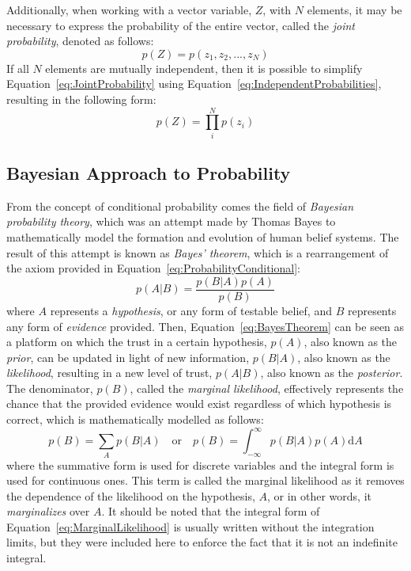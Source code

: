 \documentclass{article}
\begin{document}
Additionally, when working with a vector variable, $Z$, with $N$ elements, it may be necessary to express the probability of the entire vector, called the \emph{joint probability}, denoted as follows:
\begin{equation}
\label{eq:JointProbability}
	p\!\left(Z\right) = p\!\left(z_1,z_2,...,z_N\right)
\end{equation}
If all $N$ elements are mutually independent, then it is possible to simplify Equation~\eqref{eq:JointProbability} using Equation~\eqref{eq:IndependentProbabilities}, resulting in the following form:
\begin{equation}
\label{eq:IndependentJointProbability}
	p\!\left(Z\right) = \prod_{i}^{N} p\!\left(z_i\right)
\end{equation}

\subsection{Bayesian Approach to Probability}
\label{subsec:BayesianProbability}

From the concept of conditional probability comes the field of \emph{Bayesian probability theory}, which was an attempt made by Thomas Bayes to mathematically model the formation and evolution of human belief systems. The result of this attempt is known as \emph{Bayes' theorem}, which is a rearrangement of the axiom provided in Equation~\eqref{eq:ProbabilityConditional}:
\begin{equation}
\label{eq:BayesTheorem}
	p\!\left(A|B\right) = \frac{p\!\left(B|A\right) p\!\left(A\right)}{p\!\left(B\right)}
\end{equation}
where $A$ represents a \emph{hypothesis}, or any form of testable belief, and $B$ represents any form of \emph{evidence} provided. Then, Equation~\eqref{eq:BayesTheorem} can be seen as a platform on which the trust in a certain hypothesis, $p\!\left(A\right)$, also known as the \emph{prior}, can be updated in light of new information, $p\!\left(B|A\right)$, also known as the \emph{likelihood}, resulting in a new level of trust, $p\!\left(A|B\right)$, also known as the \emph{posterior}. The denominator, $p\!\left(B\right)$, called the \emph{marginal likelihood}, effectively represents the chance that the provided evidence would exist regardless of which hypothesis is correct, which is mathematically modelled as follows:
\begin{equation}
\label{eq:MarginalLikelihood}
	p\!\left(B\right) = \sum_{A} p\!\left(B|A\right) \quad \text{or} \quad p\!\left(B\right) = \int_{-\infty}^{\infty} p\!\left(B|A\right) p\!\left(A\right) \text{d}A
\end{equation}
where the summative form is used for discrete variables and the integral form is used for continuous ones. This term is called the marginal likelihood as it removes the dependence of the likelihood on the hypothesis, $A$, or in other words, it \emph{marginalizes} over $A$. It should be noted that the integral form of Equation~\eqref{eq:MarginalLikelihood} is usually written without the integration limits, but they were included here to enforce the fact that it is not an indefinite integral.
\end{document}
